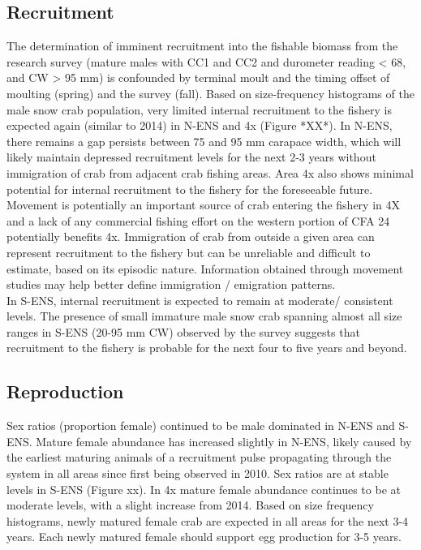 \documentclass[paper=a4, fontsize=11pt]{article}
\begin{document}
\subsection{Recruitment}
The determination of imminent recruitment into the fishable biomass from the research survey (mature males with CC1 and CC2 and durometer reading < 68, and CW > 95 mm) is confounded by terminal moult and the timing offset of moulting (spring) and the survey (fall). Based on size-frequency histograms of the male snow crab population, very limited internal recruitment to the fishery is expected again (similar to 2014) in N-ENS and 4x (Figure *XX*). In N-ENS, there remains a gap persists between 75 and 95 mm carapace width, which will likely maintain depressed recruitment levels for the next 2-3 years without immigration of crab from adjacent crab fishing areas. Area 4x also shows minimal potential for internal recruitment to the fishery for the foreseeable future. Movement is potentially an important source of crab entering the fishery in 4X and a lack of any commercial fishing effort on the western portion of CFA 24 potentially benefits 4x. Immigration of crab from outside a given area can represent recruitment to the fishery but can be unreliable and difficult to estimate,  based on its episodic nature. Information obtained through movement studies may help better define immigration / emigration patterns. \\

In S-ENS, internal recruitment is expected to remain at moderate/ consistent levels. The presence of small immature male snow crab spanning almost all size ranges in S-ENS (20-95 mm CW) observed by the survey suggests that recruitment to the fishery is probable for the next four to five years and beyond. 
\clearpage

\subsection{Reproduction}

Sex ratios (proportion female) continued to be male dominated in N-ENS and S-ENS. Mature female abundance has increased slightly in N-ENS, likely caused by the earliest maturing animals of a recruitment pulse propagating through the system in all areas since first being observed in 2010.  Sex ratios are at stable levels in S-ENS (Figure xx). In 4x mature female abundance continues to be at moderate levels, with a slight increase from 2014. Based on size frequency histograms, newly matured female crab are expected in all areas for the next 3-4 years. Each newly matured female should support egg production for 3-5 years. \\
\end{document}
